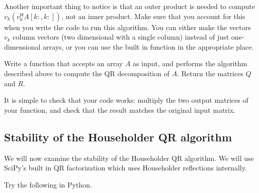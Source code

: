 
Another important thing to notice is that an outer product is needed to compute
$v_k \left( v_k^\mathsf{H} A[k:,k:] \right)$, not an inner product.
Make sure that you account for this when you write the code to run this algorithm.
You can either make the vectors $v_k$ column vectors (two dimensional with a single column) instead of just one-dimensional arrays, or you can use the built in function  in the appropriate place.

\begin{problem}
\label{prob:HouseholderQR}
Write a function  that accepts an array $A$ as input, and performs
the algorithm described above to compute the QR decomposition of $A$. Return the
matrices $Q$ and $R$.

It is simple to check that your code works: multiply the two output matrices
of your function, and check that the result matches the original input matrix.
\end{problem}

\subsection*{Stability of the Householder QR algorithm}
We will now examine the stability of the Householder QR algorithm.
We will use SciPy's built in QR factorization which uses Householder reflections internally.

Try the following in Python.

